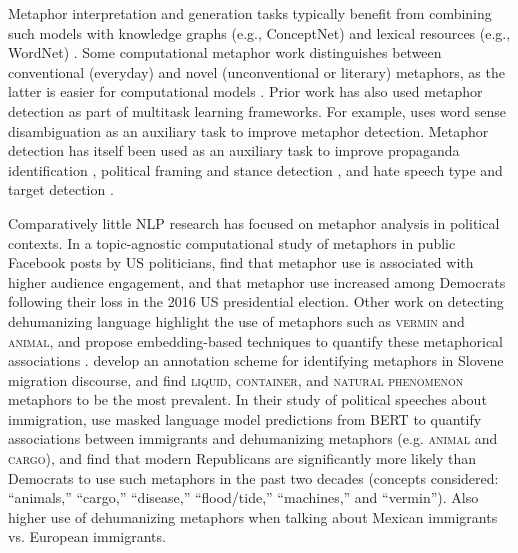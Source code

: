 Metaphor interpretation and generation tasks typically benefit from combining such models with knowledge graphs (e.g., ConceptNet) and lexical resources (e.g., WordNet) \citep{stowe_metaphor_2021, chakrabarty_mermaid_2021,chakrabarty_i_2023,ge_explainable_2022,mao_metapro_2022,mao_metapro_2023}. Some computational metaphor work distinguishes between conventional (everyday) and novel (unconventional or literary) metaphors, as the latter is easier for computational models \citep{haagsma_detecting_2016,do_dinh_weeding_2018,neidlein_analysis_2020}. Prior work has also used metaphor detection as part of multitask learning frameworks. For example, \citet{le_multi-task_2020} uses word sense disambiguation as an auxiliary task to improve metaphor detection. Metaphor detection has itself been used as an auxiliary task to improve propaganda identification \citep{baleato_rodriguez_paper_2023}, political framing and stance detection \citep{huguet_cabot_pragmatics_2020}, and hate speech type and target detection \citep{lemmens_improving_2021}. 


Comparatively little NLP research has focused on metaphor analysis in political contexts. In a topic-agnostic computational study of metaphors in public Facebook posts by US politicians, \citet{prabhakaran_how_2021} find that metaphor use is associated with higher audience engagement, and that metaphor use increased among Democrats following their loss in the 2016 US presidential election. Other work on detecting dehumanizing language highlight the use of metaphors such as \textsc{vermin} and \textsc{animal}, and propose embedding-based techniques to quantify these metaphorical associations \citep{mendelsohn2020framework,engelmann_dataset_2024,zhang_beyond_2024}. \citet{zwitter_vitez_extracting_2022} develop an annotation scheme for identifying metaphors in Slovene migration discourse, and find \textsc{liquid}, \textsc{container}, and \textsc{natural phenomenon} metaphors to be the most prevalent. In their study of political speeches about immigration, \citet{card2022computational} use masked language model predictions from BERT to quantify associations between immigrants and dehumanizing metaphors (e.g. \textsc{animal} and \textsc{cargo}), and find that modern Republicans are significantly more likely than Democrats to use such metaphors in the past two decades (concepts considered:  “animals,” “cargo,” “disease,” “flood/tide,” “machines,” and “vermin”). Also higher use of dehumanizing metaphors when talking about Mexican immigrants vs. European immigrants.


